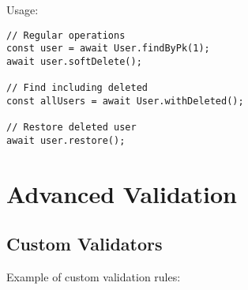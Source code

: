 \documentclass[12pt,a4paper]{book}
\begin{document}
		Usage:
		\begin{verbatim}
// Regular operations
const user = await User.findByPk(1);
await user.softDelete();

// Find including deleted
const allUsers = await User.withDeleted();

// Restore deleted user
await user.restore();
		\end{verbatim}
	
	\section{Advanced Validation}
	
	\subsection{Custom Validators}
		Example of custom validation rules:
		
\end{document}
